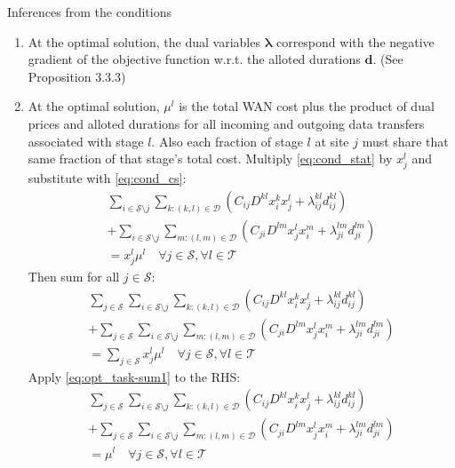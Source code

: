 Inferences from the conditions
\begin{enumerate}
	\item At the optimal solution, the dual variables $\boldsymbol{\lambda}$ correspond with the negative gradient of the objective function w.r.t. the alloted durations $\mathbf{d}$. (See \cite{bertsekas1999nonlinear} Proposition 3.3.3)
	\item At the optimal solution, $\mu^l$ is the total WAN cost plus the product of dual prices and alloted durations for all incoming and outgoing data transfers associated with stage $l$.
	Also each fraction of stage $l$ at site $j$ must share that same fraction of that stage's total cost. 
	Multiply \eqref{eq:cond_stat} by $x_j^l$ and substitute with \eqref{eq:cond_cs}:
	\begin{align}
		\sum_{i\in\mathcal{S}\setminus j} \sum_{k:(k,l)\in\mathcal{D}} (C_{ij}D^{kl}x_i^kx_j^l + \lambda_{ij}^{kl}d_{ij}^{kl}) \nonumber \\
		+ \sum_{i\in\mathcal{S}\setminus j}\sum_{m:(l,m)\in\mathcal{D}} (C_{ji}D^{lm}x_j^lx_i^m + \lambda_{ji}^{lm}d_{ji}^{lm}) \nonumber \\
		= x_j^l\mu^l
		\quad \forall j\in\mathcal{S},\forall l\in\mathcal{T}
	\end{align}
	Then sum for all $j\in\mathcal{S}$:
	\begin{align}
		\sum_{j\in\mathcal{S}}\sum_{i\in\mathcal{S}\setminus j} \sum_{k:(k,l)\in\mathcal{D}} (C_{ij}D^{kl}x_i^kx_j^l + \lambda_{ij}^{kl}d_{ij}^{kl}) \nonumber \\
		+ \sum_{j\in\mathcal{S}}\sum_{i\in\mathcal{S}\setminus j}\sum_{m:(l,m)\in\mathcal{D}} (C_{ji}D^{lm}x_j^lx_i^m + \lambda_{ji}^{lm}d_{ji}^{lm}) \nonumber \\
		= \sum_{j\in\mathcal{S}}x_j^l\mu^l
		\quad \forall j\in\mathcal{S},\forall l\in\mathcal{T} \nonumber
	\end{align}
	Apply \eqref{eq:opt_task-sum1} to the RHS:
	\begin{align}
		\sum_{j\in\mathcal{S}}\sum_{i\in\mathcal{S}\setminus j} \sum_{k:(k,l)\in\mathcal{D}} (C_{ij}D^{kl}x_i^kx_j^l + \lambda_{ij}^{kl}d_{ij}^{kl}) \nonumber \\
		+ \sum_{j\in\mathcal{S}}\sum_{i\in\mathcal{S}\setminus j}\sum_{m:(l,m)\in\mathcal{D}} (C_{ji}D^{lm}x_j^lx_i^m + \lambda_{ji}^{lm}d_{ji}^{lm}) \nonumber \\
		= \mu^l
		\quad \forall j\in\mathcal{S},\forall l\in\mathcal{T}
	\end{align}
\end{enumerate}

